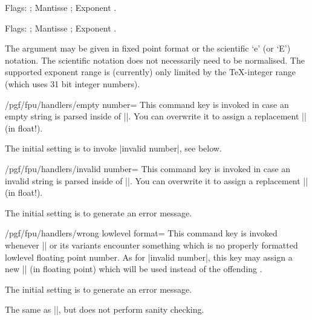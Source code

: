 \begin{command}{\pgfmathfloatparsenumber{}}
\begin{codeexample}[]
\pgfmathfloattomacro{\pgfmathresult}{\F}{\M}{\E}
Flags: \F; Mantisse \M; Exponent \E.
\end{codeexample}

\begin{codeexample}[]
\pgfmathfloattomacro{\pgfmathresult}{\F}{\M}{\E}
Flags: \F; Mantisse \M; Exponent \E.
\end{codeexample}
	The argument  may be given in fixed point format or the scientific `e' (or `E') notation. The scientific notation does not necessarily need to be normalised. The supported exponent range is (currently) only limited by the \TeX-integer range (which uses 31 bit integer numbers).
\end{command}

\begin{key}{/pgf/fpu/handlers/empty number=}
	This command key is invoked in case an empty string is parsed inside of |\pgfmathfloatparsenumber|. You can overwrite it to assign a replacement |\pgfmathresult| (in float!).

	The initial setting is to invoke |invalid number|, see below.
\end{key}
\begin{key}{/pgf/fpu/handlers/invalid number=}
	This command key is invoked in case an invalid string is parsed inside of |\pgfmathfloatparsenumber|. You can overwrite it to assign a replacement |\pgfmathresult| (in float!).

	The initial setting is to generate an error message.
\end{key}
\begin{key}{/pgf/fpu/handlers/wrong lowlevel format=}
	This command key is invoked whenever |\pgfmathfloattoregisters| or its variants encounter something which is no properly formatted lowlevel floating point number. As for |invalid number|, this key may assign a new |\pgfmathresult| (in floating point) which will be used instead of the offending .

	The initial setting is to generate an error message.
\end{key}

\begin{command}{\pgfmathfloatqparsenumber{}}
	The same as |\pgfmathfloatparsenumber|, but does not perform sanity checking.
\end{command}

